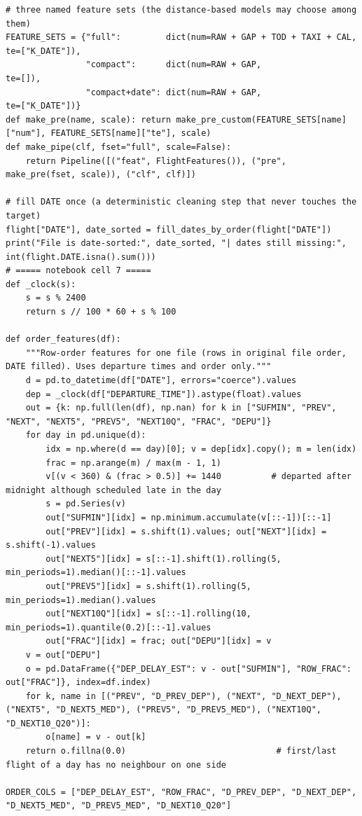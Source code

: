 \documentclass[12pt,a4paper]{article}
\begin{document}
\begin{lstlisting}[style=code]
# three named feature sets (the distance-based models may choose among them)
FEATURE_SETS = {"full":         dict(num=RAW + GAP + TOD + TAXI + CAL, te=["K_DATE"]),
                "compact":      dict(num=RAW + GAP,                    te=[]),
                "compact+date": dict(num=RAW + GAP,                    te=["K_DATE"])}
def make_pre(name, scale): return make_pre_custom(FEATURE_SETS[name]["num"], FEATURE_SETS[name]["te"], scale)
def make_pipe(clf, fset="full", scale=False):
    return Pipeline([("feat", FlightFeatures()), ("pre", make_pre(fset, scale)), ("clf", clf)])

# fill DATE once (a deterministic cleaning step that never touches the target)
flight["DATE"], date_sorted = fill_dates_by_order(flight["DATE"])
print("File is date-sorted:", date_sorted, "| dates still missing:", int(flight.DATE.isna().sum()))
# ===== notebook cell 7 =====
def _clock(s):
    s = s % 2400
    return s // 100 * 60 + s % 100

def order_features(df):
    """Row-order features for one file (rows in original file order, DATE filled). Uses departure times and order only."""
    d = pd.to_datetime(df["DATE"], errors="coerce").values
    dep = _clock(df["DEPARTURE_TIME"]).astype(float).values
    out = {k: np.full(len(df), np.nan) for k in ["SUFMIN", "PREV", "NEXT", "NEXT5", "PREV5", "NEXT10Q", "FRAC", "DEPU"]}
    for day in pd.unique(d):
        idx = np.where(d == day)[0]; v = dep[idx].copy(); m = len(idx)
        frac = np.arange(m) / max(m - 1, 1)
        v[(v < 360) & (frac > 0.5)] += 1440          # departed after midnight although scheduled late in the day
        s = pd.Series(v)
        out["SUFMIN"][idx] = np.minimum.accumulate(v[::-1])[::-1]
        out["PREV"][idx] = s.shift(1).values; out["NEXT"][idx] = s.shift(-1).values
        out["NEXT5"][idx] = s[::-1].shift(1).rolling(5, min_periods=1).median()[::-1].values
        out["PREV5"][idx] = s.shift(1).rolling(5, min_periods=1).median().values
        out["NEXT10Q"][idx] = s[::-1].rolling(10, min_periods=1).quantile(0.2)[::-1].values
        out["FRAC"][idx] = frac; out["DEPU"][idx] = v
    v = out["DEPU"]
    o = pd.DataFrame({"DEP_DELAY_EST": v - out["SUFMIN"], "ROW_FRAC": out["FRAC"]}, index=df.index)
    for k, name in [("PREV", "D_PREV_DEP"), ("NEXT", "D_NEXT_DEP"), ("NEXT5", "D_NEXT5_MED"), ("PREV5", "D_PREV5_MED"), ("NEXT10Q", "D_NEXT10_Q20")]:
        o[name] = v - out[k]
    return o.fillna(0.0)                              # first/last flight of a day has no neighbour on one side

ORDER_COLS = ["DEP_DELAY_EST", "ROW_FRAC", "D_PREV_DEP", "D_NEXT_DEP", "D_NEXT5_MED", "D_PREV5_MED", "D_NEXT10_Q20"]


\end{lstlisting}
\end{document}
